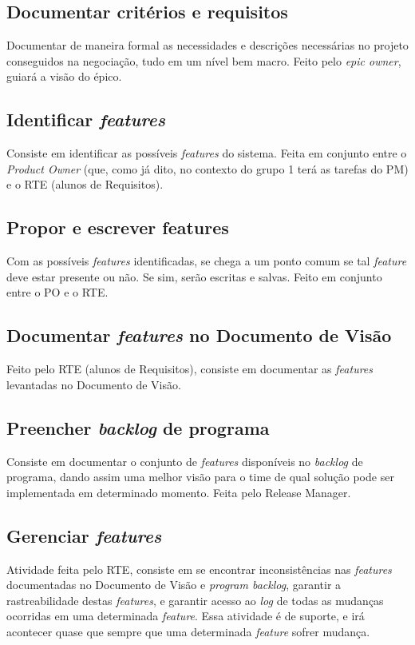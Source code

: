\subsection{Documentar critérios e requisitos}
Documentar de maneira formal as necessidades e descrições necessárias no projeto conseguidos na negociação, tudo em um nível bem macro. Feito pelo \emph{epic owner}, guiará a visão do épico.

\subsection{Identificar \emph{features}}
Consiste em identificar as possíveis \emph{features} do sistema. Feita em conjunto entre o \emph{Product Owner} (que, como já dito, no contexto do grupo 1 terá as tarefas do PM) e o RTE (alunos de Requisitos).

\subsection{Propor e escrever features}
Com as possíveis \emph{features} identificadas, se chega a um ponto comum se tal \emph{feature} deve estar presente ou não. Se sim, serão escritas e salvas. Feito em conjunto entre o PO e o RTE.

\subsection{Documentar \emph{features} no Documento de Visão}
Feito pelo RTE (alunos de Requisitos), consiste em documentar as \emph{features} levantadas no Documento de Visão.

\subsection{Preencher \emph{backlog} de programa}
Consiste em documentar o conjunto de \emph{features} disponíveis no \emph{backlog} de programa, dando assim uma melhor visão para o time de qual solução pode ser implementada em determinado momento. Feita pelo Release Manager.

\subsection{Gerenciar \emph{features}}
Atividade feita pelo RTE, consiste em se encontrar inconsistências nas \emph{features} documentadas no Documento de Visão e \emph{program backlog}, garantir a rastreabilidade destas \emph{features}, e garantir acesso ao \emph{log} de todas as mudanças ocorridas em uma determinada \emph{feature}. Essa atividade é de suporte, e irá acontecer quase que sempre que uma determinada \emph{feature} sofrer mudança.

